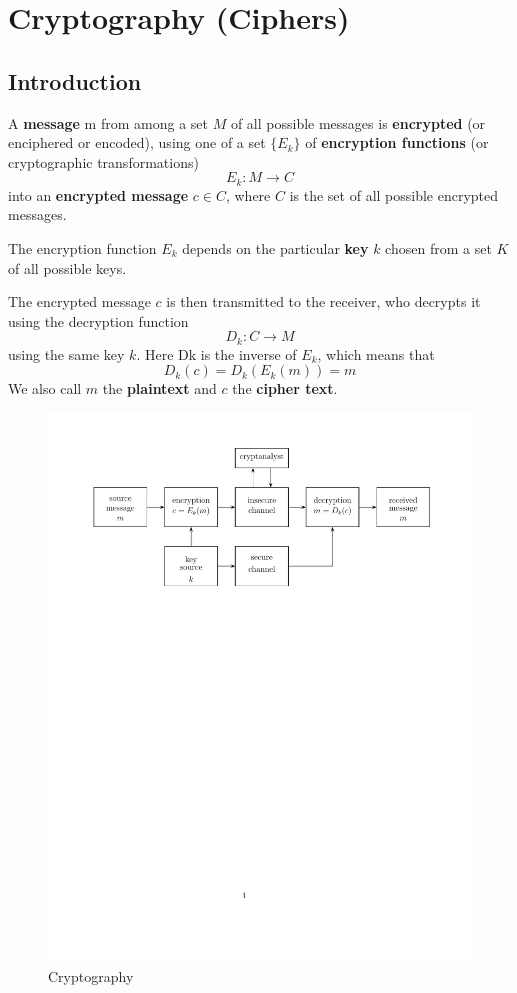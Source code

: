 \documentclass{article}
\begin{document}
\newpage

\setcounter{section}{6}

\section{Cryptography (Ciphers)}

\subsection{Introduction}

A \textbf{message} m from among a set $M$ of all possible messages is \textbf{encrypted} (or enciphered or encoded), using one of a set $\{E_{k}\}$ of \textbf{encryption functions} (or cryptographic transformations)
    \[E_{k}: M \rightarrow C\]
    into an \textbf{encrypted message} $c \in C$, where $C$ is the set of all possible encrypted messages.

The encryption function $E_{k}$ depends on the particular \textbf{key} $k$ chosen from a set $K$ of all possible keys.

The encrypted message $c$ is then transmitted to the receiver, who decrypts it using the decryption function
    \[D_{k}: C \rightarrow M\]
    using the same key $k$. Here Dk is the inverse of $E_{k}$, which means that
    \[D_{k}(c)=D_{k}(E_{k}(m))=m\]
We also call $m$ the \textbf{plaintext} and $c$ the \textbf{cipher text}.

\begin{figure}[htbp]
    \center
    \includegraphics[width=\textwidth]{img/C7_figure_1}
    \caption{Cryptography}
\end{figure}
\end{document}
